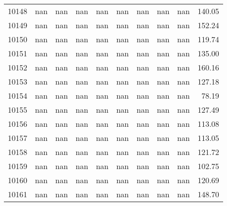 \begin{tabular}{lrrrrrrrrr}
10148 & nan & nan & nan & nan & nan & nan & nan & nan & 140.05 \\
10149 & nan & nan & nan & nan & nan & nan & nan & nan & 152.24 \\
10150 & nan & nan & nan & nan & nan & nan & nan & nan & 119.74 \\
10151 & nan & nan & nan & nan & nan & nan & nan & nan & 135.00 \\
10152 & nan & nan & nan & nan & nan & nan & nan & nan & 160.16 \\
10153 & nan & nan & nan & nan & nan & nan & nan & nan & 127.18 \\
10154 & nan & nan & nan & nan & nan & nan & nan & nan & 78.19 \\
10155 & nan & nan & nan & nan & nan & nan & nan & nan & 127.49 \\
10156 & nan & nan & nan & nan & nan & nan & nan & nan & 113.08 \\
10157 & nan & nan & nan & nan & nan & nan & nan & nan & 113.05 \\
10158 & nan & nan & nan & nan & nan & nan & nan & nan & 121.72 \\
10159 & nan & nan & nan & nan & nan & nan & nan & nan & 102.75 \\
10160 & nan & nan & nan & nan & nan & nan & nan & nan & 120.69 \\
10161 & nan & nan & nan & nan & nan & nan & nan & nan & 148.70 \\
\end{tabular}
